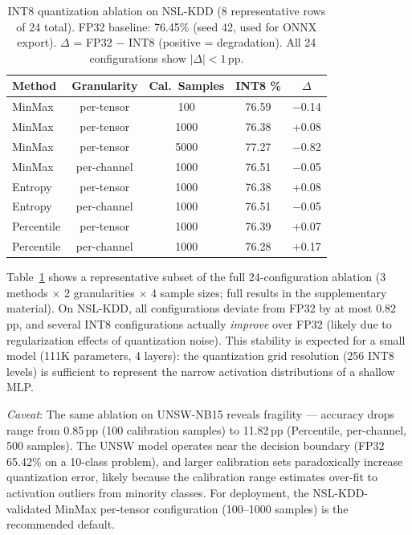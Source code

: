 \documentclass[10pt,twocolumn]{article}
\begin{document}
\begin{table}[t]
\centering
\caption{INT8 quantization ablation on NSL-KDD (8 representative rows
of 24 total). FP32 baseline: 76.45\% (seed 42, used for ONNX export).
$\Delta$ = FP32 $-$ INT8 (positive = degradation).
All 24 configurations show $|\Delta| < 1$\,pp.}
\label{tab:quant_ablation}
\small
\begin{tabular}{@{}lcccc@{}}
\toprule
\textbf{Method} & \textbf{Granularity} & \textbf{Cal.\ Samples} & \textbf{INT8 \%} & \textbf{$\Delta$} \\
\midrule
MinMax     & per-tensor  & 100   & 76.59 & $-$0.14 \\
MinMax     & per-tensor  & 1000  & 76.38 & +0.08 \\
MinMax     & per-tensor  & 5000  & 77.27 & $-$0.82 \\
MinMax     & per-channel & 1000  & 76.51 & $-$0.05 \\
\midrule
Entropy    & per-tensor  & 1000  & 76.38 & +0.08 \\
Entropy    & per-channel & 1000  & 76.51 & $-$0.05 \\
\midrule
Percentile & per-tensor  & 1000  & 76.39 & +0.07 \\
Percentile & per-channel & 1000  & 76.28 & +0.17 \\
\bottomrule
\end{tabular}
\end{table}

Table~\ref{tab:quant_ablation} shows a representative subset of the full
24-configuration ablation (3 methods $\times$ 2 granularities $\times$
4 sample sizes; full results in the supplementary material).
On NSL-KDD, all configurations deviate from FP32 by at most
0.82\,pp, and several INT8 configurations actually \emph{improve} over
FP32 (likely due to regularization effects of quantization noise).
This stability is expected for a small model (111K parameters, 4 layers):
the quantization grid resolution (256 INT8 levels) is sufficient to
represent the narrow activation distributions of a shallow MLP.

\emph{Caveat}: The same ablation on UNSW-NB15 reveals fragility ---
accuracy drops range from 0.85\,pp (100 calibration samples) to
11.82\,pp (Percentile, per-channel, 500 samples).
The UNSW model operates near the decision boundary (FP32 65.42\%
on a 10-class problem), and larger calibration sets paradoxically
increase quantization error, likely because the calibration range
estimates over-fit to activation outliers from minority classes.
For deployment, the NSL-KDD-validated MinMax per-tensor configuration
(100--1000 samples) is the recommended default.
\end{document}
